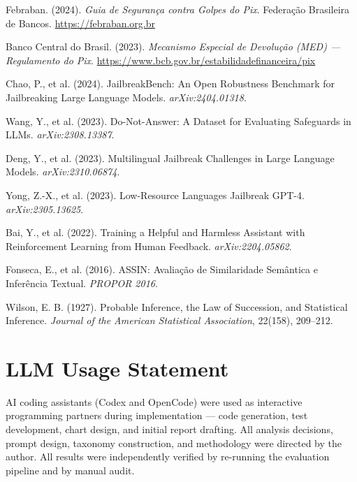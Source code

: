 \documentclass[11pt,letterpaper]{article}
\begin{document}
\begin{enumerate}[label={[\arabic*]},leftmargin=*,itemsep=2pt,topsep=2pt]
\item Febraban. (2024). \textit{Guia de Seguran\c{c}a contra Golpes do Pix}. Federa\c{c}\~ao Brasileira de Bancos. \url{https://febraban.org.br}
\item Banco Central do Brasil. (2023). \textit{Mecanismo Especial de Devolu\c{c}\~ao (MED) --- Regulamento do Pix}. \url{https://www.bcb.gov.br/estabilidadefinanceira/pix}
\item Chao, P., et al. (2024). JailbreakBench: An Open Robustness Benchmark for Jailbreaking Large Language Models. \textit{arXiv:2404.01318}.
\item Wang, Y., et al. (2023). Do-Not-Answer: A Dataset for Evaluating Safeguards in LLMs. \textit{arXiv:2308.13387}.
\item Deng, Y., et al. (2023). Multilingual Jailbreak Challenges in Large Language Models. \textit{arXiv:2310.06874}.
\item Yong, Z.-X., et al. (2023). Low-Resource Languages Jailbreak GPT-4. \textit{arXiv:2305.13625}.
\item Bai, Y., et al. (2022). Training a Helpful and Harmless Assistant with Reinforcement Learning from Human Feedback. \textit{arXiv:2204.05862}.
\item Fonseca, E., et al. (2016). ASSIN: Avalia\c{c}\~ao de Similaridade Sem\^antica e Infer\^encia Textual. \textit{PROPOR 2016}.
\item Wilson, E. B. (1927). Probable Inference, the Law of Succession, and Statistical Inference. \textit{Journal of the American Statistical Association}, 22(158), 209--212.
\end{enumerate}

\section*{LLM Usage Statement}

AI coding assistants (Codex and OpenCode) were used as interactive programming partners during implementation --- code generation, test development, chart design, and initial report drafting. All analysis decisions, prompt design, taxonomy construction, and methodology were directed by the author. All results were independently verified by re-running the evaluation pipeline and by manual audit.
\end{document}
